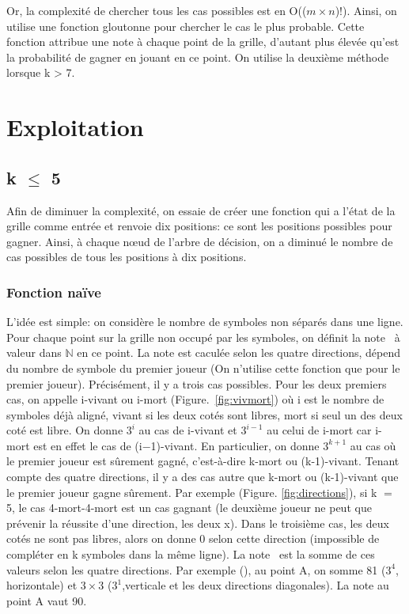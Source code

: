 \documentclass{beamer}
\begin{document}
Or, la complexité de chercher tous les cas possibles est en O(($m \times n$)!). Ainsi, on utilise une fonction gloutonne pour chercher le cas le plus probable. Cette fonction attribue une note à chaque point de la grille, d'autant plus élevée qu'est la probabilité de gagner en jouant en ce point.
On utilise la deuxième méthode lorsque k > 7.


\section{Exploitation}
\subsection{k $\le$ 5}
Afin de diminuer la complexité, on essaie de créer une fonction qui a l'état de la grille comme entrée et renvoie dix positions: ce sont les positions possibles pour gagner. Ainsi, à chaque nœud de l'arbre de décision, on a diminué le nombre de cas possibles de tous les positions à dix positions.
\subsubsection{Fonction naïve}
L'idée est simple: on considère le nombre de symboles non séparés dans une ligne. 
Pour chaque point sur la grille non occupé par les symboles, on définit la \og note \fg \ à valeur dans $\mathbb{N}$ en ce point. La note est caculée selon les quatre directions, dépend du nombre de symbole du premier joueur (On n'utilise cette fonction que pour le premier joueur). Précisément, il y a trois cas possibles. Pour les deux premiers cas, on appelle i-vivant ou i-mort (\mbox{Figure. \ref{fig:vivmort}}) où i est le nombre de symboles déjà aligné, vivant si les deux cotés sont libres, mort si seul un des deux coté est libre. On donne $3^{i}$ au cas de i-vivant et $3^{i-1}$ au celui de i-mort car i-mort est en effet le cas de (i$-$1)-vivant. En particulier, on donne $3^{k+1}$ au cas où le premier joueur est sûrement gagné, c'est-à-dire k-mort ou (k-1)-vivant. Tenant compte des quatre directions, il y a des cas autre que k-mort ou (k-1)-vivant que le premier joueur gagne sûrement. Par exemple (Figure. \ref{fig:directions}), si k $=$ 5, le cas 4-mort-4-mort est un cas gagnant (le deuxième joueur ne peut que prévenir la réussite d'une direction, les deux x). Dans le troisième cas, les deux cotés ne sont pas libres, alors on donne 0 selon cette direction (impossible de compléter en k symboles dans la même ligne). La \og note \fg \ est la somme de ces valeurs selon les quatre directions. Par exemple (), au point A, on somme 81 ($3^{4}$, horizontale) et $3\times 3$ ($3^1$,verticale et les deux directions diagonales). La note au point A vaut 90.\par
\end{document}
